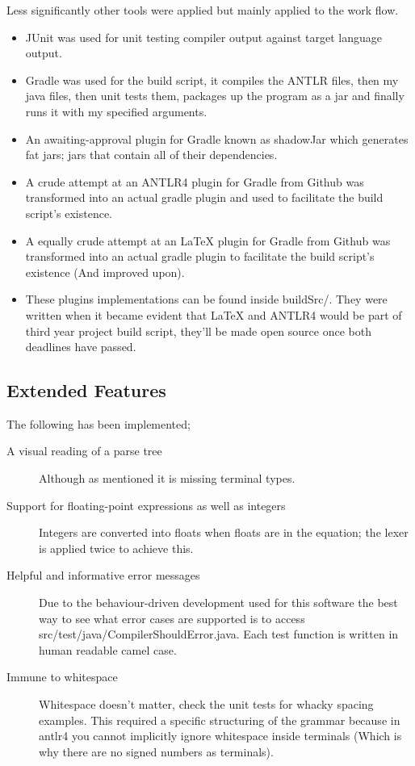 \documentclass[a4paper,12pt]{article}
\begin{document}
Less significantly other tools were applied but mainly applied to the work flow.
\begin{itemize}
    \item JUnit was used for unit testing compiler output against target language output.
    \item Gradle was used for the build script, it compiles the ANTLR files, then my java files, then unit tests them, packages up the program as a jar and finally runs it with my specified arguments.
    \item An awaiting-approval plugin for Gradle known as shadowJar which generates fat jars; jars that contain all of their dependencies.
    \item A crude attempt at an ANTLR4 plugin for Gradle from Github was transformed into an actual gradle plugin and used to facilitate the build script's existence.
    \item A equally crude attempt at an LaTeX plugin for Gradle from Github was transformed into an actual gradle plugin to facilitate the build script's existence (And improved upon).
    \item These plugins implementations can be found inside buildSrc/. They were written when it became evident that LaTeX and ANTLR4 would be part of third year project build script, they'll be made open source once both deadlines have passed.
\end{itemize}

\subsection{Extended Features}
The following has been implemented;
\begin{description}
    \item[A visual reading of a parse tree] \hfill
        Although as mentioned it is missing terminal types.
    \item[Support for floating-point expressions as well as integers] \hfill
        Integers are converted into floats when floats are in the equation; the lexer is applied twice to achieve this.
    \item[Helpful and informative error messages]
        Due to the behaviour-driven development used for this software the best way to see what error cases are supported is to access src/test/java/CompilerShouldError.java. Each test function is written in human readable camel case.
    \item[Immune to whitespace]
       Whitespace doesn't matter, check the unit tests for whacky spacing examples. This required a specific structuring of the grammar because in antlr4 you cannot implicitly ignore whitespace inside terminals (Which is why there are no signed numbers as terminals).
\end{description}
\end{document}
